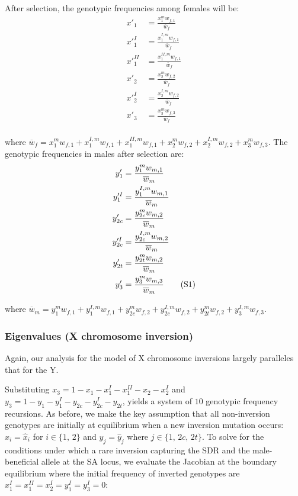 \documentclass{article}
\newcommand\numberthis{\addtocounter{equation}{1}\tag{\theequation}}
\begin{document}
\begin{appendices}
\noindent After selection, the genotypic frequencies among females will be:
\begin{align*}
	x'_{1}     &= \frac{x^m_1 w_{f,1}     }{\overline{w}_{f}} \\
	x'^{I}_{1}  &= \frac{x^{I,m}_1 w_{f,1} }{\overline{w}_{f}} \\
	x'^{II}_{1} &= \frac{x^{II,m}_1 w_{f,1}}{\overline{w}_{f}} \\
	x'_{2}      &= \frac{x^m_2 w_{f,2}     }{\overline{w}_{f}} \\
	x'^{I}_{2}  &= \frac{x^{I,m}_2 w_{f,2} }{\overline{w}_{f}} \\
	x'_{3}      &= \frac{x^m_3 w_{f,3}     }{\overline{w}_{f}} \\
\end{align*}
    
\noindent where $\overline{w}_{f} = x^m_1 w_{f,1} + x^{I,m}_1 w_{f,1} + x^{II,m}_1 w_{f,1} + x^m_2 w_{f,2} + x^{I,m}_2 w_{f,2} + x^m_3 w_{f,3} $. The genotypic frequencies in males after selection are:
\begin{align*}
	y'_{1}       &= \frac{y^m_1 w_{m,1}       }{\overline{w}_{m}} \\
	y'^I_{1}     &= \frac{y^{I,m}_{1} w_{m,1} }{\overline{w}_{m}} \\
	y'_{2c}      &= \frac{y^{m}_{2c} w_{m,2}  }{\overline{w}_{m}}  \\
	y'^I_{2c}    &= \frac{y^{I,m}_{2c} w_{m,2}}{\overline{w}_{m}} \\
	y'_{2t}      &= \frac{y^m_{2t} w_{m,2}    }{\overline{w}_{m}} \\
	y'_{3}       &= \frac{y^{m}_3 w_{m,3}   }{\overline{w}_{m}} \numberthis
\end{align*}
  
\noindent where $\overline{w}_{m} = y^m_1 w_{f,1} + y^{I,m}_{1} w_{f,1} + y^{m}_{2c} w_{f,2} + y^{I,m}_{2c} w_{f,2} + y^m_{2t} w_{f,2} + y^{I,m}_3 w_{f,3} $.



\subsubsection*{Eigenvalues (X chromosome inversion)}

Again, our analysis for the model of X chromosome inversions largely paralleles that for the Y.

Substituting $x_3 = 1 - x_{1} - x^I_{1} - x^{II}_{1} - x_{2} - x^I_{2}$ and $y_3 = 1 - y_1 - y^I_1 - y_{2c} - y^I_{2c} - y_{2t}$, yields a system of $10$ genotypic frequency recursions. As before, we make the key assumption that all non-inversion genotypes are initially at equilibrium when a new inversion mutation occurs: $x_i = \hat{x}_i$ for $i \in \{1,\,2 \}$ and $y_j = \hat{y}_j$ where $j \in \{ 1,\,2c,\,2t \}$. To solve for the conditions under which a rare inversion capturing the SDR and the male-beneficial allele at the SA locus, we evaluate the Jacobian at the boundary equilibrium where the initial frequency of inverted genotypes are $x^{I}_{1} = x^{II}_{1} = x^I_2 = y^I_1 = y^I_3 = 0$:



\end{appendices}
\end{document}
